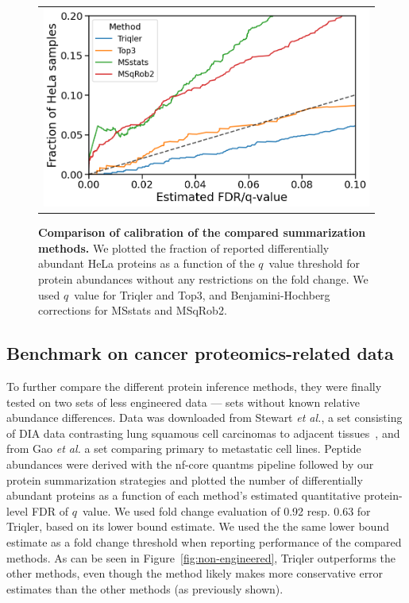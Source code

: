 \documentclass[10pt,letterpaper]{article}
\begin{document}
\begin{figure}[hbt]
    \centering
    \begin{tabular}{c} 
        \includegraphics[width=0.5\linewidth]{./img/calibration_ID_0.png}
    \end{tabular}
  \caption{{\bf Comparison of calibration of the compared summarization methods.} We plotted the fraction of reported differentially abundant HeLa proteins as a function of the $q$~value threshold for protein abundances without any restrictions on the fold change. We used $q$~value for Triqler and Top3, and Benjamini-Hochberg corrections for MSstats and MSqRob2. \label{fig:frac_hela_vs_fdr}}
\end{figure}


\subsection*{Benchmark on cancer proteomics-related data}

To further compare the different protein inference methods, they were finally tested on two sets of less engineered data --- sets without known relative abundance differences.  Data was downloaded from Stewart {\em et al.}, a set consisting of DIA data contrasting lung squamous cell carcinomas to adjacent tissues~\cite{stewart2017relative}, and from Gao {\em et al.} a set comparing primary to metastatic cell lines\cite{gao2021data}. Peptide abundances were derived with the nf-core quantms pipeline followed by our protein summarization strategies and plotted the number of differentially abundant proteins as a function of each method's estimated quantitative protein-level FDR of $q$~value. We used fold change evaluation of 0.92 resp. 0.63 for Triqler, based on its lower bound estimate. We used the the same lower bound estimate as a fold change threshold when reporting performance of the compared methods. As can be seen in Figure~\ref{fig:non-engineered}, Triqler outperforms the other methods, even though the method likely makes more conservative error estimates than the other methods (as previously shown).
\end{document}

